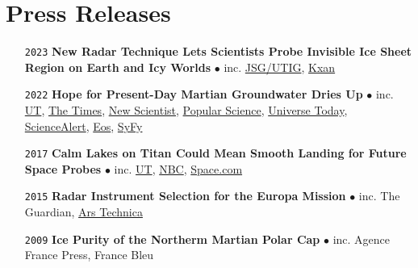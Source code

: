 \section*{Press Releases}

\begin{itemize}[leftmargin=3.8em, labelsep=1.5em]
    \setlength\itemsep{-.5em}
    
    \item[\texttt{2023}] \textbf{New Radar Technique Lets Scientists Probe Invisible Ice Sheet Region on Earth and Icy Worlds} $\bullet$ inc. \href{https://ig.utexas.edu/news/2023/new-radar-technique-lets-scientists-probe-invisible-ice-sheet-region-on-earth-and-icy-worlds/}{JSG/UTIG}, \href{https://www.kxan.com/news/science/texas-students-work-travels-to-jupiter-helps-track-climate-change-on-earth/}{Kxan}
    
    \item[\texttt{2022}] \textbf{Hope for Present-Day Martian Groundwater Dries Up} $\bullet$ inc. \href{https://news.utexas.edu/2022/01/24/hope-for-present-day-martian-groundwater-dries-up/}{UT}, \href{https://www.thetimes.co.uk/article/hope-dries-up-of-water-on-mars-qngbmwdgp}{The Times}, \href{https://www.newscientist.com/article/2305601-mars-lake-may-actually-be-volcanic-rocks-buried-beneath-the-ice-cap/}{New Scientist}, \href{https://www.popsci.com/science/liquid-water-on-mars-debate/}{Popular Science}, \href{https://www.universetoday.com/154242/is-the-underground-lake-on-mars-just-volcanic-rock/#more-154242}{Universe Today}, \href{https://www.sciencealert.com/liquid-water-detected-under-mars-polar-ice-cap-was-probably-just-rock-new-study-reveals}{ScienceAlert}, \href{https://eos.org/articles/the-bumpy-search-for-liquid-water-at-the-south-pole-of-mars}{Eos}, \href{https://www.syfy.com/syfy-wire/bad-astronomy-liquid-water-under-martian-ice-cap-debate}{SyFy}
    
    \item[\texttt{2017}] \textbf{Calm Lakes on Titan Could Mean Smooth Landing for Future Space Probes} $\bullet$ inc. \href{https://news.utexas.edu/2017/07/06/calm-lakes-on-titan/}{UT}, \href{https://www.nbcnews.com/mach/science/you-can-forget-about-surfing-saturn-s-moon-titan-here-ncna780711}{NBC}, \href{https://www.space.com/37417-saturn-moon-titan-calm-seas-cassini.html}{Space.com}
    
    \item[\texttt{2015}] \textbf{Radar Instrument Selection for the Europa Mission} $\bullet$ inc. The Guardian, \href{https://arstechnica.com/science/2015/11/attempt-no-landing-there-yeah-right-were-going-to-europa/}{Ars Technica}
    \item[\texttt{2009}] \textbf{Ice Purity of the Northerm Martian Polar Cap} $\bullet$ inc. Agence France Press, France Bleu
    
\end{itemize}